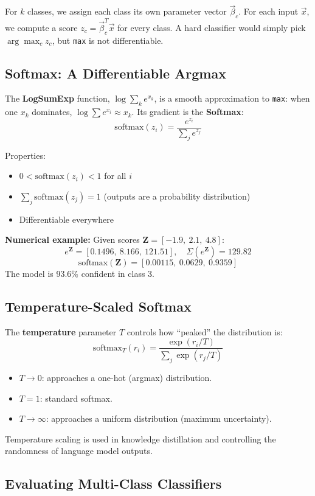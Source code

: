 \documentclass[12pt]{article}
\begin{document}
For $k$ classes, we assign each class its own parameter vector $\vec{\beta}_c$. For each input $\vec{x}$, we compute a score $z_c = \vec{\beta}_c^T\vec{x}$ for every class. A hard classifier would simply pick $\arg\max_c z_c$, but \texttt{max} is not differentiable.

\subsection{Softmax: A Differentiable Argmax}

The \textbf{LogSumExp} function, $\log\sum_k e^{x_k}$, is a smooth approximation to \texttt{max}: when one $x_k$ dominates, $\log\sum e^{x_i} \approx x_k$. Its gradient is the \textbf{Softmax}:
\[
\text{softmax}(z_i) = \frac{e^{z_i}}{\sum_j e^{z_j}}
\]

Properties:
\begin{itemize}
  \item $0 < \text{softmax}(z_i) < 1$ for all $i$
  \item $\sum_j \text{softmax}(z_j) = 1$ (outputs are a probability distribution)
  \item Differentiable everywhere
\end{itemize}

\textbf{Numerical example:} Given scores $\boldsymbol{Z} = [-1.9,\ 2.1,\ 4.8]$:
\[
e^{\boldsymbol{Z}} = [0.1496,\ 8.166,\ 121.51], \quad \Sigma(e^{\boldsymbol{Z}}) = 129.82
\]
\[
\text{softmax}(\boldsymbol{Z}) = [0.00115,\ 0.0629,\ 0.9359]
\]
The model is 93.6\% confident in class 3.

\subsection{Temperature-Scaled Softmax}

The \textbf{temperature} parameter $T$ controls how ``peaked'' the distribution is:
\[
\text{softmax}_T(r_i) = \frac{\exp(r_i/T)}{\sum_j \exp(r_j/T)}
\]
\begin{itemize}
  \item $T \to 0$: approaches a one-hot (argmax) distribution.
  \item $T = 1$: standard softmax.
  \item $T \to \infty$: approaches a uniform distribution (maximum uncertainty).
\end{itemize}
Temperature scaling is used in knowledge distillation and controlling the randomness of language model outputs.

\subsection{Evaluating Multi-Class Classifiers}
\end{document}
